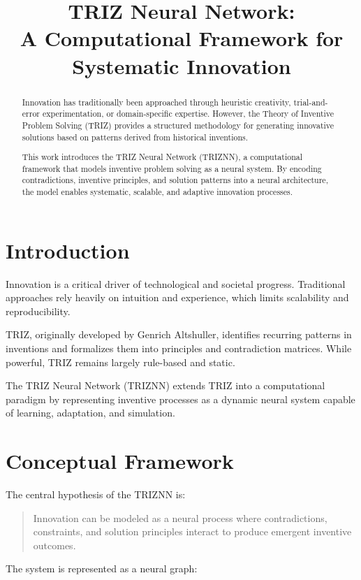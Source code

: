 \documentclass[12pt]{article}
\title{\textbf{TRIZ Neural Network: \\ A Computational Framework for Systematic Innovation}}
\author{}
\date{}
\begin{document}
\maketitle

\begin{abstract}
Innovation has traditionally been approached through heuristic creativity, trial-and-error experimentation, or domain-specific expertise. However, the Theory of Inventive Problem Solving (TRIZ) provides a structured methodology for generating innovative solutions based on patterns derived from historical inventions.

This work introduces the TRIZ Neural Network (TRIZNN), a computational framework that models inventive problem solving as a neural system. By encoding contradictions, inventive principles, and solution patterns into a neural architecture, the model enables systematic, scalable, and adaptive innovation processes.
\end{abstract}

\section{Introduction}

Innovation is a critical driver of technological and societal progress. Traditional approaches rely heavily on intuition and experience, which limits scalability and reproducibility.

TRIZ, originally developed by Genrich Altshuller, identifies recurring patterns in inventions and formalizes them into principles and contradiction matrices. While powerful, TRIZ remains largely rule-based and static.

The TRIZ Neural Network (TRIZNN) extends TRIZ into a computational paradigm by representing inventive processes as a dynamic neural system capable of learning, adaptation, and simulation.

\section{Conceptual Framework}

The central hypothesis of the TRIZNN is:

\begin{quote}
Innovation can be modeled as a neural process where contradictions, constraints, and solution principles interact to produce emergent inventive outcomes.
\end{quote}

The system is represented as a neural graph:
\end{document}
